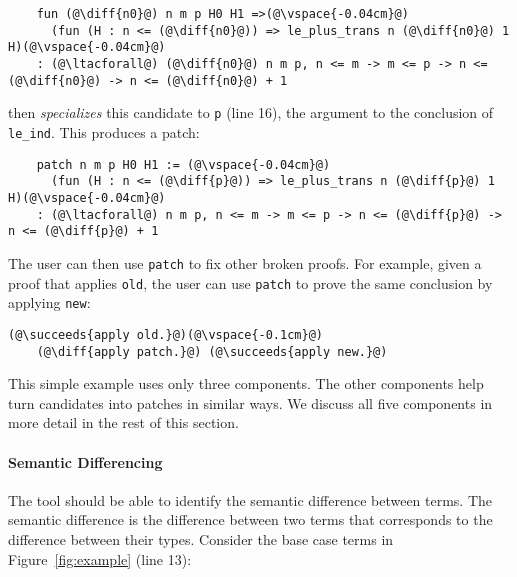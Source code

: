 \begin{lstlisting}
    fun (@\diff{n0}@) n m p H0 H1 =>(@\vspace{-0.04cm}@)
      (fun (H : n <= (@\diff{n0}@)) => le_plus_trans n (@\diff{n0}@) 1 H)(@\vspace{-0.04cm}@)
    : (@\ltacforall@) (@\diff{n0}@) n m p, n <= m -> m <= p -> n <= (@\diff{n0}@) -> n <= (@\diff{n0}@) + 1
\end{lstlisting}

\sysname then \textit{specializes} this candidate to \lstinline{p} (line 16), the argument
to the conclusion of \lstinline{le_ind}. This produces a patch:

\begin{lstlisting}
    patch n m p H0 H1 := (@\vspace{-0.04cm}@)
      (fun (H : n <= (@\diff{p}@)) => le_plus_trans n (@\diff{p}@) 1 H)(@\vspace{-0.04cm}@)
    : (@\ltacforall@) n m p, n <= m -> m <= p -> n <= (@\diff{p}@) -> n <= (@\diff{p}@) + 1
\end{lstlisting}

The user can then use \lstinline{patch} to fix other broken proofs.
For example, given a proof that applies \lstinline{old}, the user can use \lstinline{patch} to prove the same conclusion
by applying \lstinline{new}:

\begin{lstlisting}[language=coq]
    (@\succeeds{apply old.}@)(@\vspace{-0.1cm}@)
    (@\diff{apply patch.}@) (@\succeeds{apply new.}@)
\end{lstlisting}

This simple example uses only three components. The other components help turn candidates
into patches in similar ways. We discuss all five components in more detail in the
rest of this section.

\paragraph{Semantic Differencing} The tool should be able to identify the semantic difference between terms.
The semantic difference is the difference between two terms that corresponds to
the difference between their types. Consider the base case terms in Figure~\ref{fig:example} (line 13):


